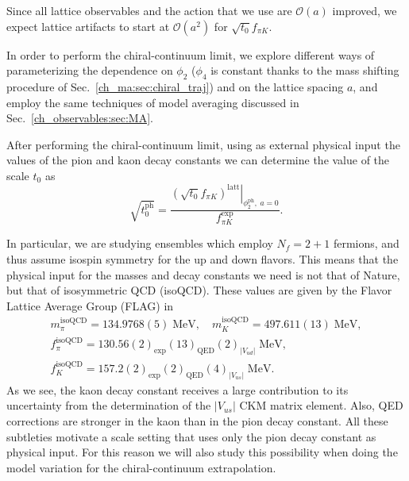 Since all lattice observables and the action that we use are $\mathcal{O}(a)$ improved, we expect lattice artifacts to start at $\mathcal{O}(a^2)$ for $\sqrt{t_0}f_{\pi K}$.

In order to perform the chiral-continuum limit, we explore different ways of parameterizing the dependence on $\phi_2$ ($\phi_4$ is constant thanks to the mass shifting procedure of Sec.~\ref{ch_ma:sec:chiral_traj}) and on the lattice spacing $a$, and employ the same techniques of model averaging discussed in Sec.~\ref{ch_observables:sec:MA}.

After performing the chiral-continuum limit, using as external physical input the values of the pion and kaon decay constants we can determine the value of the scale $t_0$ as
\begin{equation}
\sqrt{t_0^{\textrm{ph}}}=\frac{\left.\left(\sqrt{t_0}f_{\pi K}\right)^{\textrm{latt}}\right|_
{\phi_2^{\textrm{ph}},\;a=0}}{f_{\pi K}^{\textrm{exp}}}.
\end{equation}

In particular, we are studying ensembles which employ $N_f=2+1$ fermions, and thus assume isospin symmetry for the up and down flavors. This means that the physical input for the masses and decay constants we need is not that of Nature, but that of isosymmetric QCD (isoQCD). These values are given by the Flavor Lattice Average Group (FLAG) in~\citep{FlavourLatticeAveragingGroupFLAG:2021npn}
\begin{gather}
\label{ch_ss:eq:isoQCD}
m_{\pi}^{\textrm{isoQCD}}=134.9768(5)\;{\textrm{MeV}}, \quad
m_{K}^{\textrm{isoQCD}}=497.611(13)\;{\textrm{MeV}}, \\
f_{\pi}^{\textrm{isoQCD}}=130.56(2)_{\textrm{exp}}(13)_{\textrm{QED}}(2)_{|V_{ud}|}\;{\textrm{MeV}}, \quad \\
f_{K}^{\textrm{isoQCD}}=157.2(2)_{\textrm{exp}}(2)_{\textrm{QED}}(4)_{|V_{us}|}\;{\textrm{MeV}}.
\end{gather} 
As we see, the kaon decay constant receives a large contribution to its uncertainty from the determination of the $|V_{us}|$ CKM matrix element. Also, QED corrections are stronger in the kaon than in the pion decay constant. All these subtleties motivate a scale setting that uses only the pion decay constant as physical input. For this reason we will also study this possibility when doing the model variation for the chiral-continuum extrapolation.



